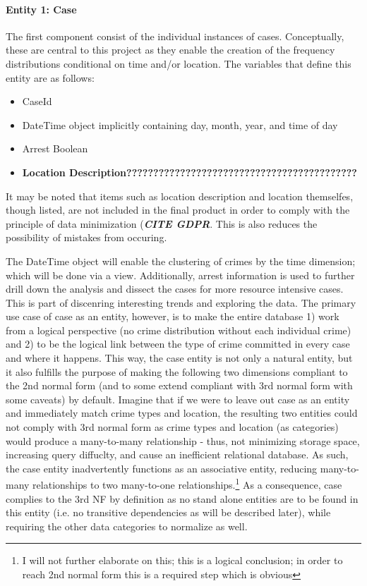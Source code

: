 \documentclass[a4paper]{article}
\begin{document}
\paragraph{Entity 1: Case} The first component consist of the individual instances of cases. Conceptually, these are central to this project as they enable the creation of the frequency distributions conditional on time and/or location. The variables that define this entity are as follows:

\begin{itemize}
  \item CaseId
  \item DateTime object implicitly containing day, month, year, and time of day 
  \item Arrest Boolean  
\item \textbf{Location Description???????????????????????????????????????????}
\end{itemize}
 
It may be noted that items such as location description and location themselfes, though listed, are not included in the final product in order to comply with the principle of data minimization (\textbf{\textit{CITE GDPR}}. This is also reduces the possibility of mistakes from occuring. 

The DateTime object will enable the clustering of crimes by the time dimension; which will be done via a view. Additionally, arrest information is used to further drill down the analysis and dissect the cases for more resource intensive cases. This is part of discenring interesting trends and exploring the data. The primary use case of case as an entity, however, is to make the entire database 1) work from a logical perspective (no crime distribution without each individual crime) and 2) to be the logical link between the type of crime committed in every case and where it happens. This way, the case entity is not only a natural entity, but it also fulfills the purpose of making the following two dimensions compliant to the 2nd normal form (and to some extend compliant with 3rd normal form with some caveats) by default. Imagine that if we were to leave out case as an entity and immediately match crime types and location, the resulting two entities could not comply with 3rd normal form as crime types and location (as categories) would produce a many-to-many relationship - thus, not minimizing storage space, increasing query diffuclty, and cause an inefficient relational database. As such, the case entity inadvertently functions as an associative entity, reducing many-to-many relationships to two many-to-one relationships.\footnote{I will not further elaborate on this; this is a logical conclusion; in order to reach 2nd normal form this is a required step which is obvious} As a consequence, case complies to the 3rd NF by definition as no stand alone entities are to be found in this entity (i.e. no transitive dependencies as will be described later), while requiring the other data categories to normalize as well.
\end{document}
